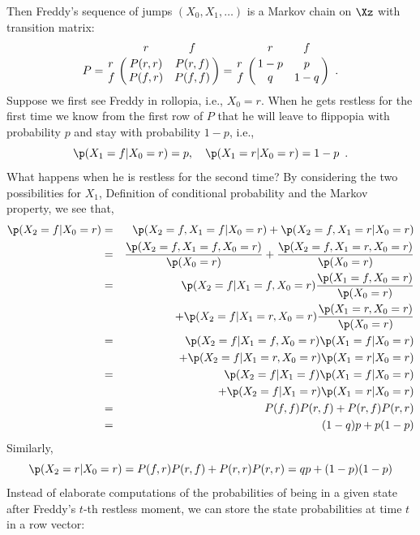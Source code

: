 \begin{example}
Then Freddy's sequence of jumps $(X_0, X_1,\ldots)$ is a Markov chain on $\Xz$ with transition matrix:
\begin{equation}\label{E:FlippantFreddyP}
P 
= \bordermatrix{~ & r & f \cr 
r & P(r,r) & P(r,f)\cr 
f & P(f,r) & P(f,f) }
= \bordermatrix{~ & r & f \cr 
r & 1-p & p \cr
f & q & 1-q } \enspace .
\end{equation}
Suppose we first see Freddy in rollopia, i.e., $X_0=r$.  When he gets restless for the first time we know from the first row of $P$ that he will leave to flippopia with probability $p$ and stay with probability $1-p$, i.e.,
\begin{equation}\label{E:Freddy1Step}
\p(X_1=f | X_0=r) = p, \quad \p(X_1=r | X_0=r) = 1-p \enspace .
\end{equation}
What happens when he is restless for the second time?  By considering the two possibilities for $X_1$, Definition of conditional probability and the Markov property, we see that,
\begin{eqnarray}
\p(X_2 = f | X_0 = r) 
&=& \p(X_2=f, X_1=f | X_0=r) + \p(X_2=f, X_1=r | X_0=r) \notag \\
&=& \frac{\p(X_2=f, X_1=f , X_0=r)}{\p(X_0=r)} + \frac{\p(X_2=f, X_1=r , X_0=r)}{\p(X_0=r)} \notag \\
&=& \p(X_2=f | X_1=f , X_0=r)\frac{\p(X_1=f , X_0=r)}{\p(X_0=r)} \notag \\
&& \qquad + \p(X_2=f | X_1=r , X_0=r) \frac{\p(X_1=r , X_0=r)}{\p(X_0=r)} \notag \\
&=&{\p(X_2=f | X_1=f , X_0=r)\p(X_1=f | X_0=r)} \notag \\
&& \qquad +{\p(X_2=f | X_1=r , X_0=r) \p(X_1=r | X_0=r)} \notag \\
&=& \p(X_2=f | X_1=f) \p(X_1=f | X_0=r) \notag \\
&& \qquad+ \p(X_2=f | X_1=r) \p(X_1=r | X_0=r) \notag \\
&=& P(f,f) P(r,f) + P(r,f) P(r,r) \notag \\
&=& (1-q) p + p (1-p) \label{E:Freddy2Stepa}
\end{eqnarray}
Similarly, 
\begin{equation} \label{E:Freddy2Stepb}
\p(X_2=r | X_0 =r) = P(f,r) P(r,f) + P(r,r) P(r,r) = q p + (1-p)(1-p)
\end{equation}
Instead of elaborate computations of the probabilities of being in a given state after Freddy's $t$-th restless moment, we can store the state probabilities at time $t$ in a row vector:

\end{example}
